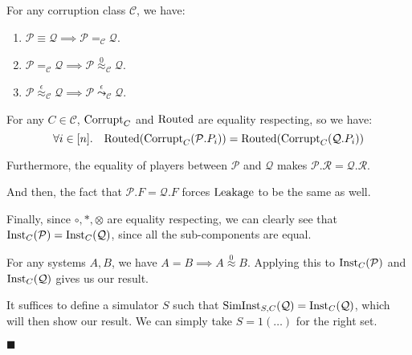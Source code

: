 \begin{theorem}
  \label{thm:equality_hierarchy}
For any corruption class $\mathcal{C}$, we have:
\begin{enumerate}
\item $\mathcal{P} \equiv \mathcal{Q} \implies \mathcal{P} =_\mathcal{C} \mathcal{Q}$.
\item $\mathcal{P} =_{\mathcal{C}} \mathcal{Q} \implies \mathcal{P} \overset{0}{\approx}_\mathcal{C} \mathcal{Q}$.
\item $\mathcal{P} \overset{\epsilon}{\approx}_{\mathcal{C}} \mathcal{Q} \implies \mathcal{P} \overset{\epsilon}{\leadsto}_\mathcal{C} \mathcal{Q}$.
\end{enumerate}


For any $C \in \mathcal{C}$, $\text{Corrupt}_{C}$ and $\text{Routed}$ are equality respecting,
so we have:
$$
\forall i \in [n].\quad \text{Routed}(\text{Corrupt}_C(\mathcal{P}.P_i)) = 
\text{Routed}(\text{Corrupt}_C(\mathcal{Q}.P_i))
$$

Furthermore, the equality of players between $\mathcal{P}$ and $\mathcal{Q}$
makes $\mathcal{P}.\mathcal{R} = \mathcal{Q}.\mathcal{R}$.

And then, the fact that $\mathcal{P}.F = \mathcal{Q}.F$ forces $\text{Leakage}$
to be the same as well.

Finally, since $\circ, *, \otimes$ are equality respecting, we
can clearly see that $\text{Inst}_C(\mathcal{P}) = \text{Inst}_C(\mathcal{Q})$,
since all the sub-components are equal.

 For any systems $A, B$, we have $A = B \implies A \overset{0}{\approx} B$.
Applying this to $\text{Inst}_C(\mathcal{P})$ and $\text{Inst}_C(\mathcal{Q})$
gives us our result.

 It suffices to define a simulator $S$ such that
$\text{SimInst}_{S, C}(\mathcal{Q}) = \text{Inst}_C(\mathcal{Q})$,
which will then show our result.
We can simply take $S = 1(\ldots)$ for the right set.

$\blacksquare$
\end{theorem}

